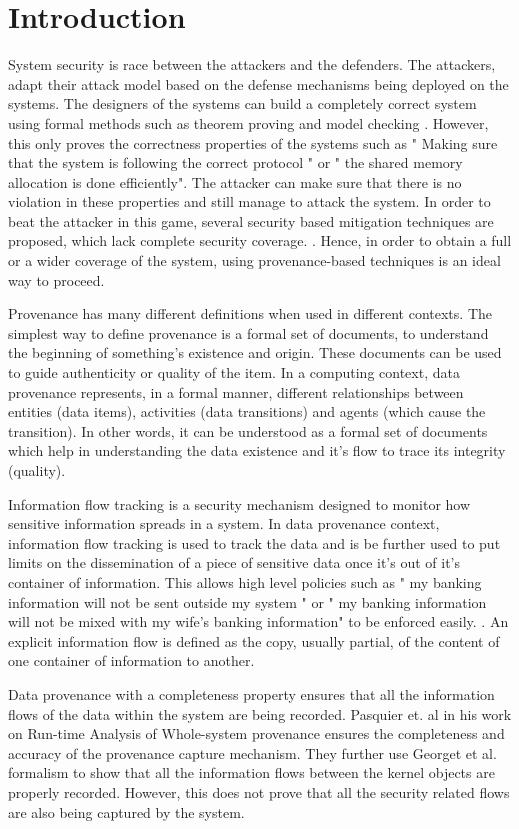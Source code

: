 \documentclass{IEEEtran}
\begin{document}
\section{Introduction}
System security is race between the attackers and the defenders. The attackers, adapt their attack model based on the defense mechanisms being deployed on the systems. The designers of the systems can build a completely correct system using formal methods such as theorem proving and model checking \cite{b4}. However, this only proves the correctness properties of the systems such as " Making sure that the system is following the correct protocol " or  " the shared memory allocation is done efficiently". The attacker can make sure that there is no violation in these properties and still manage to attack the system. In order to beat the attacker in this game, several security based mitigation techniques are proposed, which lack complete security coverage. \cite{b5}. Hence, in order to obtain a full or a wider coverage of the system, using provenance-based techniques is an ideal way to proceed. \cite{b6}

Provenance has many different definitions when used in different contexts. The simplest way to define provenance is a formal set of documents, to understand the beginning of something's existence and origin. These documents can be used to guide  authenticity or quality of the item. In a computing context, data provenance represents, in a formal manner, different relationships between entities (data items), activities (data transitions) and agents (which cause the transition). In other words, it can be understood as a formal set of documents which help in understanding the data existence and it's flow to trace its integrity (quality). \cite{b1}

Information flow tracking is a security mechanism designed to monitor how sensitive information spreads in a system. In data provenance context, information flow tracking is used to track the data and is be further used to put limits on the dissemination of a piece of sensitive data once it's out of it's container of information. This allows high level policies such as " my banking information will not be sent outside my system " or " my banking information will not be mixed with my wife's banking information" to be enforced easily.  \cite{b2}. An explicit information flow is defined as the copy, usually partial, of the content of one container of information to another. \cite{b3}

Data provenance with a completeness property ensures that all the information flows of the data within the system are being recorded. Pasquier et. al \cite{b6} in his work on Run-time Analysis of Whole-system provenance ensures the completeness and accuracy of the provenance capture mechanism. They further use Georget et al. \cite{b3} formalism to show that all the information flows between the kernel objects are properly recorded. However, this does not prove that all the security related flows are also being captured by the system. 
\end{document}
